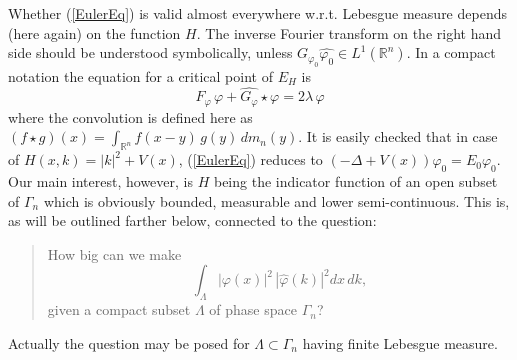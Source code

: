 \documentclass[12pt,a4paper,draft]{article}
\newcommand{\RR}[1]{\mathbb{R}^#1}
\begin{document}
Whether (\ref{EulerEq}) is valid almost everywhere w.r.t. Lebesgue measure 
depends (here again) on the function $H$. The inverse Fourier transform on
the right hand side should be understood symbolically, unless 
$G_{\varphi_0}\hat{\varphi_0}\in L^1(\RR n)$. In a compact notation the
equation for a critical point of $E_H$ is 
\begin{displaymath}
  F_{\varphi}\,\varphi+ \widehat{G_{\varphi}} \star\varphi = 2\lambda\,\varphi                     
\end{displaymath}
where the convolution is defined here as 
$(f\star g)(x)=\int_{\RR n} f(x-y)\,g(y)\,dm_n(y)$. It is easily checked that
in case of $H(x,k)=|k|^2+V(x)$, (\ref{EulerEq}) reduces to 
$(-\Delta+V(x)) \varphi_0=E_0 \varphi_0$. Our main interest, however, is
$H$ being the indicator function of an open subset of $\Gamma_n$ which is
obviously bounded, measurable and lower semi-continuous. This is, as will
be outlined farther below, connected to the question:
\begin{verse}
    How big can we make 
    \begin{equation}
             \int_{\Lambda} |\varphi(x)|^2 \, |\hat\varphi(k)|^2 dx\,dk,
    \end{equation}
    given a compact subset $\Lambda$ of phase space $\Gamma_n$?
\end{verse} 
Actually the question may be posed for $\Lambda\subset\Gamma_n$ having finite
Lebesgue measure.
\end{document}
